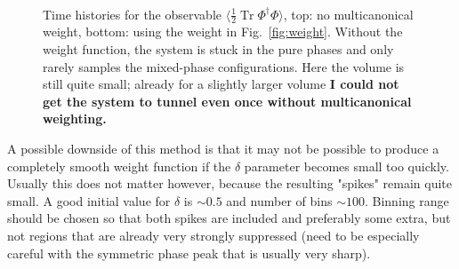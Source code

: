 \documentclass[11pt,a4paper]{article}
\newcommand\Tr{\operatorname{Tr}}
\begin{document}
\begin{figure}[H]
	\centering
	 \\
	\vspace{-0.25cm}
	\caption{Time histories for the observable $\langle\frac12 \Tr\Phi^\dagger\Phi\rangle$, top: no multicanonical weight, bottom: using the weight in Fig.~\ref{fig:weight}. Without the weight function, the system is stuck in the pure phases and only rarely samples the mixed-phase configurations. Here the volume is still quite small; already for a slightly larger volume \textbf{I could not get the system to tunnel even once without multicanonical weighting.}} 
\end{figure}


A possible downside of this method is that it may not be possible to produce a completely smooth weight function if the $\delta$ parameter becomes small too quickly. Usually this does not matter however, because the resulting "spikes" remain quite small. A good initial value for $\delta$ is $\sim 0.5$ and number of bins $\sim 100$. Binning range should be chosen so that both spikes are included and preferably some extra, but not regions that are already very strongly suppressed (need to be especially careful with the symmetric phase peak that is usually very sharp).
\end{document}
